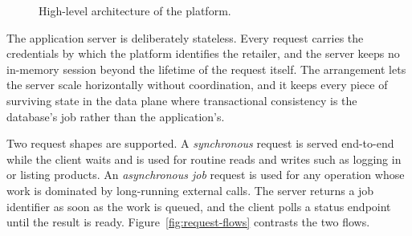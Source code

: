 \begin{figure}[ht]
{%
}
\caption{High-level architecture of the platform.}
\label{fig:three-tier}
\end{figure}

The application server is deliberately stateless. Every request carries the credentials by which the platform identifies the retailer, and the server keeps no in-memory session beyond the lifetime of the request itself. The arrangement lets the server scale horizontally without coordination, and it keeps every piece of surviving state in the data plane where transactional consistency is the database's job rather than the application's.

Two request shapes are supported. A \emph{synchronous} request is served end-to-end while the client waits and is used for routine reads and writes such as logging in or listing products. An \emph{asynchronous job} request is used for any operation whose work is dominated by long-running external calls. The server returns a job identifier as soon as the work is queued, and the client polls a status endpoint until the result is ready. Figure~\ref{fig:request-flows} contrasts the two flows.

